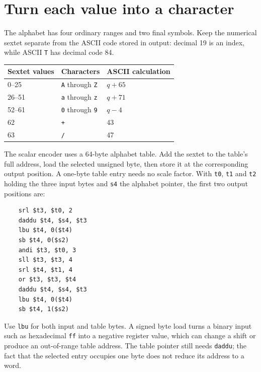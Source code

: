 \section{Turn each value into a character}
The alphabet has four ordinary ranges and two final symbols. Keep the numerical
sextet separate from the ASCII code stored in output: decimal 19 is an index, while
ASCII \texttt{T} has decimal code 84.
\begin{center}
\begin{tabular}{lll}
Sextet values & Characters & ASCII calculation \\
\hline
0--25 & \texttt{A} through \texttt{Z} & \(q+65\) \\
26--51 & \texttt{a} through \texttt{z} & \(q+71\) \\
52--61 & \texttt{0} through \texttt{9} & \(q-4\) \\
62 & \texttt{+} & 43 \\
63 & \texttt{/} & 47 \\
\end{tabular}
\end{center}

The scalar encoder uses a 64-byte alphabet table. Add the sextet to the table's full
address, load the selected unsigned byte, then store it at the corresponding output
position. A one-byte table entry needs no scale factor. With \texttt{t0}, \texttt{t1}
and \texttt{t2} holding the three input bytes and \texttt{s4} the alphabet pointer,
the first two output positions are:

\begin{verbatim}
    srl $t3, $t0, 2
    daddu $t4, $s4, $t3
    lbu $t4, 0($t4)
    sb $t4, 0($s2)
    andi $t3, $t0, 3
    sll $t3, $t3, 4
    srl $t4, $t1, 4
    or $t3, $t3, $t4
    daddu $t4, $s4, $t3
    lbu $t4, 0($t4)
    sb $t4, 1($s2)
\end{verbatim}

Use \texttt{lbu} for both input and table bytes. A signed byte load turns a binary
input such as hexadecimal \texttt{ff} into a negative register value, which can change
a shift or produce an out-of-range table address. The table pointer still needs
\texttt{daddu}; the fact that the selected entry occupies one byte does not reduce its
address to a word.
